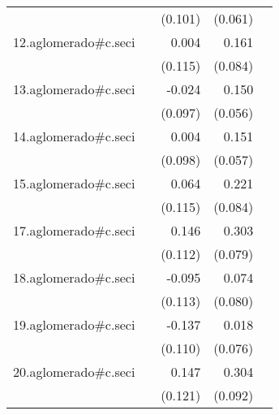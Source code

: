 {\begin{longtable}{l*{4}{D{.}{.}{-1}}}
            &                     &     (0.101)         &     (0.061)         &                     \\
\addlinespace
12.aglomerado#c.seci&                     &       0.004         &       0.161         &                     \\
            &                     &     (0.115)         &     (0.084)         &                     \\
\addlinespace
13.aglomerado#c.seci&                     &      -0.024         &       0.150\sym{**} &                     \\
            &                     &     (0.097)         &     (0.056)         &                     \\
\addlinespace
14.aglomerado#c.seci&                     &       0.004         &       0.151\sym{**} &                     \\
            &                     &     (0.098)         &     (0.057)         &                     \\
\addlinespace
15.aglomerado#c.seci&                     &       0.064         &       0.221\sym{**} &                     \\
            &                     &     (0.115)         &     (0.084)         &                     \\
\addlinespace
17.aglomerado#c.seci&                     &       0.146         &       0.303\sym{***}&                     \\
            &                     &     (0.112)         &     (0.079)         &                     \\
\addlinespace
18.aglomerado#c.seci&                     &      -0.095         &       0.074         &                     \\
            &                     &     (0.113)         &     (0.080)         &                     \\
\addlinespace
19.aglomerado#c.seci&                     &      -0.137         &       0.018         &                     \\
            &                     &     (0.110)         &     (0.076)         &                     \\
\addlinespace
20.aglomerado#c.seci&                     &       0.147         &       0.304\sym{***}&                     \\
            &                     &     (0.121)         &     (0.092)         &                     \\

\end{longtable}}
